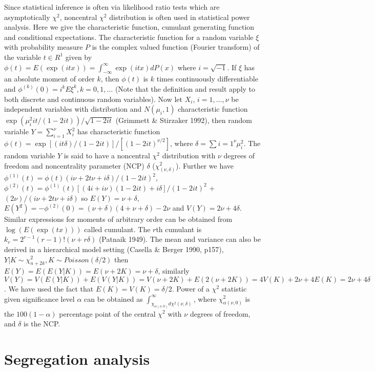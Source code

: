 Since statistical inference is often via likelihood ratio tests which are
asymptotically $\chi^2$, noncentral $\chi^2$ distribution is often used in
statistical power analysis.  Here we give the characteristic function, cumulant
generating function and conditional expectations.  The characteristic function
for a random variable $\xi$ with probability measure $P$ is the complex valued
function (Fourier transform) of the variable $t\in R^1$ given by $\phi(t) =
E(\exp(itx))=\int_{-\infty}^\infty\exp(itx)dP(x)$ where $i=\sqrt{-1}$.  If
$\xi$ has an absolute moment of order $k$, then $\phi(t)$ is $k$ times
continuously differentiable and $\phi^{(k)}(0)=i^kE\xi^k, k=0,1,\dots$ (Note
that the definition and result apply to both discrete and continuous random
variables).  Now let $X_i$, $i=1,\ldots,\nu$ be independent variables with
distribution and $N(\mu_i,1)$ characteristic function
$\exp({\mu_i^2it}/{(1-2it)})/\sqrt{1-2it}$ (Grimmett \& Stirzaker 1992), then
random variable $Y = \sum_{i=1}^\nu X_i^2$ has characteristic function $\phi(t)
= \exp[{(it\delta)}/{(1-2it)}]/[(1-2it)^{\nu/2}]$, where
$\delta=\sum{i=1}^\nu\mu_i^2$.  The random variable $Y$ is said to have a
noncentral $\chi^2$ distribution with $\nu$ degrees of freedom and
noncentrality parameter (NCP) $\delta$ ($\chi^2_{(\nu,\delta)}$).  Further we
have $\phi^{(1)}(t) = \phi(t){(i\nu+2t\nu+i\delta)}/{(1-2it)^2}$,
$\phi^{(2)}(t) = \phi^{(1)}(t){[(4i+i\nu)(1-2it)+i\delta]}/{(1-2it)^2}$ + ${(2
\nu)}/{(i\nu+2t \nu+i\delta)}$ so $E(Y) = \nu+\delta$, $E(Y^2) = -\phi^{(2)}(0)
= (\nu+\delta)(4+\nu+\delta)-2\nu$ and $V(Y) = 2\nu+4\delta$.  Similar
expressions for moments of arbitrary order can be obtained from
$\log(E(\exp(tx)))$ called cumulant.  The $r$th cumulant is $k_r =
2^{r-1}(r-1)!(\nu+r\delta)$ (Patnaik 1949).  The mean and variance can also be
derived in a hierarchical model setting (Casella \& Berger 1990, p157),
$Y|K\sim \chi^2_{n+2k}, K\sim Poisson(\delta/2)$ then $E(Y) = E(E(Y|K)) =
E(\nu+2K) = \nu+\delta$, similarly $V(Y) = V(E(Y|K)) + E(V(Y|K)) =
V(\nu+2K)+E(2(\nu+2K)) = 4V(K)+2\nu+4E(K) = 2\nu+4\delta$.  We have used the
fact that $E(K)=V(K)=\delta/2$.  Power of a $\chi^2$ statistic given
significance level $\alpha$ can be obtained as
$\int^\infty_{\chi_{\alpha(\nu,0)} d\chi^2(\nu,\delta)}$, where
$\chi_{\alpha(\nu,0)}^2$ is the $100(1-\alpha)$ percentage point of the central
$\chi^2$ with $\nu$ degrees of freedom, and $\delta$ is the NCP.


\section{Segregation analysis}

